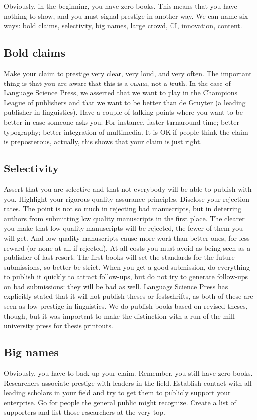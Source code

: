 \documentclass[nonflat,modfonts,output=book] {langsci/langscibook}
\begin{document}
Obviously, in the beginning, you have zero books. This means that you have nothing to show, and you must signal prestige in another way. We can name six ways:  
bold claims, 
selectivity, 
big names, 
large crowd, 
CI, 
innovation,
content. 

\subsection{Bold claims}
Make your claim to prestige very clear, very loud, and very often. The important thing is that you are aware that this is a \textsc{claim}, not a truth. In the case of Language Science Press, we asserted that we want to play in the Champions League of publishers and that we want to be better than de Gruyter (a leading publisher in linguistics). Have a couple of talking points where you want to be better in case someone asks you. For instance, faster turnaround time; better typography; better integration of multimedia. It is OK if people think the claim is preposterous, actually, this shows that your claim is just right. 

\subsection{Selectivity}
Assert that you are selective and that not everybody will be able to publish with you. Highlight your rigorous quality assurance principles. Disclose your rejection rates. The point is not so much in rejecting bad manuscripts, but in deterring authors from submitting low quality manuscripts in the first place. The clearer you make that low quality manuscripts will be rejected, the fewer of them  you will get. And low quality manuscripts cause more work than better ones, for less reward (or none at all if rejected). 
At all costs you must avoid as being seen as a publisher of last resort. The first books will set the standards for the future submissions, so better be strict. When you get a good submission, do everything to publish it quickly to attract follow-ups, but do not try to generate follow-ups on bad submissions: they will be bad as well. 
Language Science Press has explicitly stated that it will not publish theses or festschrifts, as both of these are seen as low prestige in linguistics. We do publish books based on revised theses, though, but it was important to make the distinction with a run-of-the-mill university press for thesis printouts.


\subsection{Big names}
Obviously, you have to back up your claim. Remember, you still have zero books. Researchers associate prestige with leaders in the field. Establish contact with all leading scholars in your field and try to get them to publicly support your enterprise. Go for people the general public might recognize. Create a list of supporters and list those researchers at the very top.  
\end{document}

